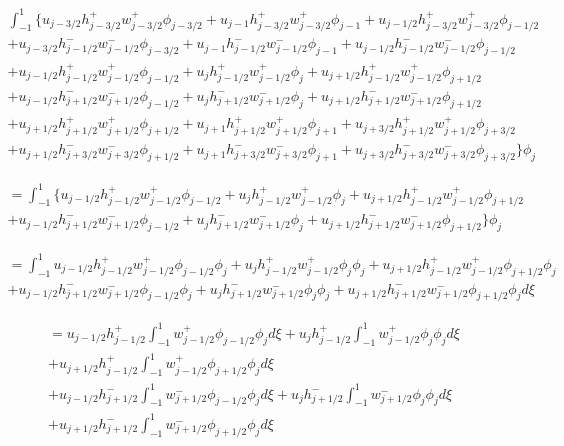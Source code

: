 \documentclass[12pt]{article}
\begin{document}
\begin{multline*}
\int_{-1}^{1}  \bigg\lbrace u_{j - 3/2} h^+_{j - 3/2}w^+_{j - 3/2} \phi_{j - 3/2} + u_{j - 1} h^+_{j - 3/2}w^+_{j - 3/2}\phi_{j - 1} + u_{j - 1/2} h^+_{j - 3/2}w^+_{j - 3/2}\phi_{j - 1/2}
\\ +u_{j - 3/2}h^-_{j - 1/2}w^-_{j - 1/2}\phi_{j - 3/2} + u_{j - 1}h^-_{j - 1/2}w^-_{j - 1/2}\phi_{j - 1} + u_{j - 1/2}h^-_{j - 1/2}w^-_{j - 1/2}\phi_{j - 1/2} 
\\ +u_{j - 1/2}h^+_{j - 1/2}w^+_{j - 1/2}\phi_{j - 1/2} + u_{j}h^+_{j - 1/2}w^+_{j - 1/2}\phi_{j } + u_{j + 1/2}h^+_{j - 1/2}w^+_{j - 1/2}\phi_{j + 1/2} 
\\ +u_{j - 1/2}h^-_{j + 1/2}w^-_{j + 1/2} \phi_{j - 1/2} + u_{j}h^-_{j + 1/2}w^-_{j + 1/2} \phi_{j } + u_{j + 1/2}h^-_{j + 1/2}w^-_{j + 1/2} \phi_{j + 1/2} 
\\ + u_{j + 1/2}h^+_{j + 1/2}w^+_{j + 1/2}\phi_{j + 1/2} + u_{j + 1}h^+_{j + 1/2}w^+_{j + 1/2}\phi_{j + 1} + u_{j + 3/2}h^+_{j + 1/2}w^+_{j + 1/2}\phi_{j + 3/2} 
\\ +u_{j + 1/2}h^-_{j + 3/2}w^-_{j + 3/2}\phi_{j + 1/2} + u_{j + 1}h^-_{j + 3/2}w^-_{j + 3/2}\phi_{j + 1} + u_{j + 3/2}h^-_{j + 3/2}w^-_{j + 3/2}\phi_{j + 3/2}\bigg\rbrace\phi_{j}
\end{multline*}

\begin{multline*}
=\int_{-1}^{1}  \bigg\lbrace u_{j - 1/2}h^+_{j - 1/2}w^+_{j - 1/2}\phi_{j - 1/2} + u_{j}h^+_{j - 1/2}w^+_{j - 1/2}\phi_{j } + u_{j + 1/2}h^+_{j - 1/2}w^+_{j - 1/2}\phi_{j + 1/2} 
\\ +u_{j - 1/2}h^-_{j + 1/2}w^-_{j + 1/2} \phi_{j - 1/2} + u_{j}h^-_{j + 1/2}w^-_{j + 1/2} \phi_{j } + u_{j + 1/2}h^-_{j + 1/2}w^-_{j + 1/2} \phi_{j + 1/2} 
\bigg\rbrace\phi_{j}
\end{multline*}

\begin{multline*}
=\int_{-1}^{1}   u_{j - 1/2}h^+_{j - 1/2}w^+_{j - 1/2}\phi_{j - 1/2}\phi_{j} + u_{j}h^+_{j - 1/2}w^+_{j - 1/2}\phi_{j }\phi_{j} + u_{j + 1/2}h^+_{j - 1/2}w^+_{j - 1/2}\phi_{j + 1/2} \phi_{j}
\\ +u_{j - 1/2}h^-_{j + 1/2}w^-_{j + 1/2} \phi_{j - 1/2}\phi_{j} + u_{j}h^-_{j + 1/2}w^-_{j + 1/2} \phi_{j } \phi_{j} + u_{j + 1/2}h^-_{j + 1/2}w^-_{j + 1/2} \phi_{j + 1/2} \phi_{j} d\xi
\end{multline*}

\begin{multline*}
=   u_{j - 1/2}h^+_{j - 1/2} \int_{-1}^{1}w^+_{j - 1/2}\phi_{j - 1/2}\phi_{j} d\xi + u_{j}h^+_{j - 1/2} \int_{-1}^{1}w^+_{j - 1/2}\phi_{j }\phi_{j}d\xi \\+ u_{j + 1/2}h^+_{j - 1/2} \int_{-1}^{1}w^+_{j - 1/2}\phi_{j + 1/2} \phi_{j} d\xi
\\ +u_{j - 1/2}h^-_{j + 1/2} \int_{-1}^{1}w^-_{j + 1/2} \phi_{j - 1/2}\phi_{j} d\xi + u_{j}h^-_{j + 1/2} \int_{-1}^{1}w^-_{j + 1/2} \phi_{j } \phi_{j} d\xi \\+ u_{j + 1/2}h^-_{j + 1/2} \int_{-1}^{1}w^-_{j + 1/2} \phi_{j + 1/2} \phi_{j} d\xi
\end{multline*}
\end{document}
